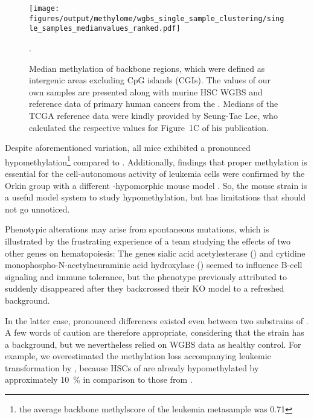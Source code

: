 \begin{figure}[!bht] 
	\centering
	\vspace{1.5em}
	\texttt{[image: figures/output/methylome/wgbs\_single\_sample\_clustering/single\_samples\_medianvalues\_ranked.pdf]} 
	\caption{Median methylation of backbone regions, which were defined as intergenic areas excluding CpG islands (CGIs). The values of our own samples are presented along with murine HSC WGBS\cite{Jeong2014} and reference data of primary human cancers from the . Medians of the TCGA reference data were kindly provided by Seung-Tae Lee, who calculated the respective values for Figure~1C of his publication\cite{Lee2015}.}
	\label{fig:single_samples_medianvalues_ranked}.
\end{figure}

Despite aforementioned variation, all \dnmtchip mice exhibited a pronounced hypomethylation\footnote{the average backbone methylscore of the \dnmtchipregular \kitpos \mllafnine leukemia metasample was \num{0.71}} compared to \dnmtwt {}. Additionally, findings that proper methylation is essential for the cell-autonomous activity of \mllafnine leukemia cells\cite{Broeske2009} were confirmed by the Orkin group with a different  -hypomorphic mouse model \cite{Trowbridge2012}. So, the \dnmtchip  mouse strain is a useful model system to study hypomethylation, but has limitations that should not go unnoticed. 

Phenotypic alterations may arise from spontaneous mutations, which is illustrated by the frustrating experience 
of a team studying the effects of two other genes on hematopoiesis\cite{Mahajan2016}: The genes sialic acid acetyl\-ester\-ase () and cytidine monophospho-N-acetylneuraminic acid hydroxylase () seemed to influence B-cell signaling and immune tolerance, but the phenotype previously attributed to  suddenly disappeared after they backcrossed their KO model to a refreshed \mmblsix background\cite{Mahajan2016}. 

In the latter case,  pronounced differences existed even between two substrains of \mmblsix. A few words of caution are therefore appropriate, considering that the \dnmtchip strain has a \mmsvjae background\cite{Simpson1997}, but we nevertheless relied on \mmblsix WGBS data\cite{Jeong2014} as healthy control. For example, we overestimated the methylation loss  accompanying leukemic transformation by \mllafnine {}, because HSCs of \dnmtwt \mmsvjae are already hypomethylated by approximately \SI{10}{\percent} in comparison to those from \mmblsix {}. 

